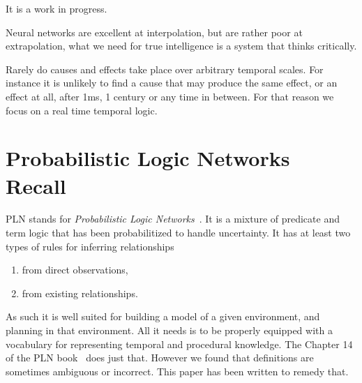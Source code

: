 \documentclass[runningheads]{llncs}
\begin{document}
It is a work in progress.

Neural networks are excellent at interpolation, but are rather poor at
extrapolation, what we need for true intelligence is a system that
thinks critically.

Rarely do causes and effects take place over arbitrary temporal
scales.  For instance it is unlikely to find a cause that may produce
the same effect, or an effect at all, after 1ms, 1 century or any time
in between.  For that reason we focus on a real time temporal logic.







\section{Probabilistic Logic Networks Recall}
\label{sec:recall}
PLN stands for \emph{Probabilistic Logic
  Networks}~\cite{Goertzel09PLN}.  It is a mixture of predicate and
term logic that has been probabilitized to handle uncertainty.  It has
at least two types of rules for inferring relationships
\begin{enumerate}
\item from direct observations,
\item from existing relationships.
\end{enumerate}
As such it is well suited for building a model of a given environment,
and planning in that environment.  All it needs is to be properly
equipped with a vocabulary for representing temporal and procedural
knowledge.  The Chapter 14 of the PLN book~\cite{Goertzel09PLN} does
just that.  However we found that definitions are sometimes ambiguous
or incorrect.  This paper has been written to remedy that.
\end{document}
